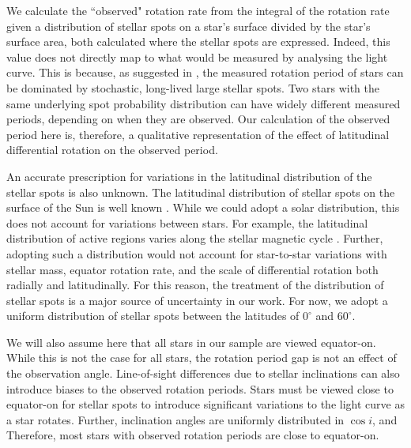 We calculate the ``observed" rotation rate from the integral of the rotation rate given a distribution of stellar spots on a star's surface divided by the star's surface area, both calculated where the stellar spots are expressed.
Indeed, this value does not directly map to what would be measured by analysing the light curve. 
This is because, as suggested in \citet{aigrain_hare_2015}, the measured rotation period of stars can be dominated by stochastic, long-lived large stellar spots.
Two stars with the same underlying spot probability distribution can have widely different measured periods, depending on when they are observed.
Our calculation of the observed period here is, therefore, a qualitative representation of the effect of latitudinal differential rotation on the observed period.

An accurate prescription for variations in the latitudinal distribution of the stellar spots is also unknown.
The latitudinal distribution of stellar spots on the surface of the Sun is well known \citep[see, e.g.,][]{maunder_note_1904,hathaway_solar_2015}.
While we could adopt a solar distribution, this does not account for variations between stars.
For example, the latitudinal distribution of active regions varies along the stellar magnetic cycle \citep[see, e.g.,][ and references therein]{grijs_stellar_2021}.
Further, adopting such a distribution would not account for star-to-star variations with stellar mass, equator rotation rate, and the scale of differential rotation both radially and latitudinally.
For this reason, the treatment of the distribution of stellar spots is a major source of uncertainty in our work.
For now, we adopt a uniform distribution of stellar spots between the latitudes of $0^{\circ}$ and $60^{\circ}$.

We will also assume here that all stars in our sample are viewed equator-on.
While this is not the case for all stars, the rotation period gap is not an effect of the observation angle.
Line-of-sight differences due to stellar inclinations can also introduce biases to the observed rotation periods.
Stars must be viewed close to equator-on for stellar spots to introduce significant variations to the light curve as a star rotates.
Further, inclination angles are uniformly distributed in $\cos{i}$, and  
Therefore, most stars with observed rotation periods are close to equator-on.

